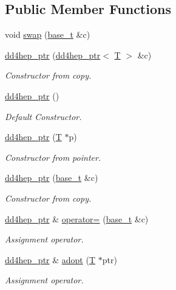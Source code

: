 \subsection*{Public Member Functions}
\begin{DoxyCompactItemize}
\item 
void \hyperlink{class_d_d4hep_1_1dd4hep__ptr_a9545ee3f6465afeefd98336c176529dd}{swap} (\hyperlink{class_d_d4hep_1_1dd4hep__ptr_a4bcbed2d2a920d0a5ffbf405263fe8d6}{base\+\_\+t} \&c)
\item 
\hyperlink{class_d_d4hep_1_1dd4hep__ptr_abac6ac3d2451af4916b051b66ed696ec}{dd4hep\+\_\+ptr} (\hyperlink{class_d_d4hep_1_1dd4hep__ptr}{dd4hep\+\_\+ptr}$<$ \hyperlink{class_t}{T} $>$ \&c)
\begin{DoxyCompactList}\small\item\em Constructor from copy. \end{DoxyCompactList}\item 
\hyperlink{class_d_d4hep_1_1dd4hep__ptr_a794418a47e2b889172eca52c9b42f2f9}{dd4hep\+\_\+ptr} ()
\begin{DoxyCompactList}\small\item\em Default Constructor. \end{DoxyCompactList}\item 
\hyperlink{class_d_d4hep_1_1dd4hep__ptr_ab9f2520963ed15270c9fbf034fbc15a9}{dd4hep\+\_\+ptr} (\hyperlink{class_t}{T} $\ast$p)
\begin{DoxyCompactList}\small\item\em Constructor from pointer. \end{DoxyCompactList}\item 
\hyperlink{class_d_d4hep_1_1dd4hep__ptr_a37f6577690b416db238cf3153dbb966e}{dd4hep\+\_\+ptr} (\hyperlink{class_d_d4hep_1_1dd4hep__ptr_a4bcbed2d2a920d0a5ffbf405263fe8d6}{base\+\_\+t} \&c)
\begin{DoxyCompactList}\small\item\em Constructor from copy. \end{DoxyCompactList}\item 
\hyperlink{class_d_d4hep_1_1dd4hep__ptr}{dd4hep\+\_\+ptr} \& \hyperlink{class_d_d4hep_1_1dd4hep__ptr_a08249cfe600aa0ad78b8871db6df8b4f}{operator=} (\hyperlink{class_d_d4hep_1_1dd4hep__ptr_a4bcbed2d2a920d0a5ffbf405263fe8d6}{base\+\_\+t} \&c)
\begin{DoxyCompactList}\small\item\em Assignment operator. \end{DoxyCompactList}\item 
\hyperlink{class_d_d4hep_1_1dd4hep__ptr}{dd4hep\+\_\+ptr} \& \hyperlink{class_d_d4hep_1_1dd4hep__ptr_aa6519c1c4d2d455b6b5cfad3318d5cc9}{adopt} (\hyperlink{class_t}{T} $\ast$ptr)
\begin{DoxyCompactList}\small\item\em Assignment operator. \end{DoxyCompactList}\end{DoxyCompactItemize}



